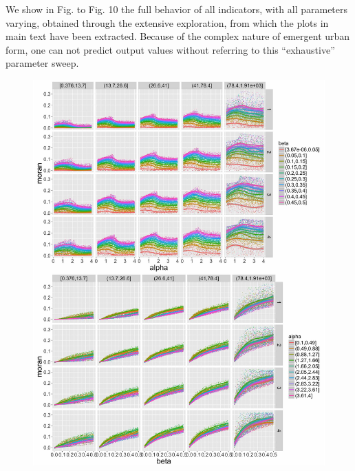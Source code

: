 
We show in Fig. to Fig. 10 the full behavior of all indicators, with all parameters varying, obtained through the extensive exploration, from which the plots in main text have been extracted. Because of the complex nature of emergent urban form, one can not predict output values without referring to this ``exhaustive'' parameter sweep.


\begin{figure}
\includegraphics[width=\linewidth]{Figures/Final/A-density-moran.jpg}
\end{figure}


